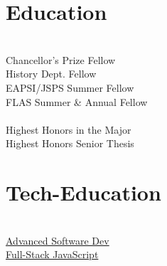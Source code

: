 \documentclass[]{deedy-resume-openfont}
\begin{document}
\begin{minipage}[t]{0.26\textwidth}

\section{Education}
 \\
Chancellor's Prize Fellow \\
History Dept. Fellow \\
EAPSI/JSPS Summer Fellow \\
FLAS Summer \& Annual Fellow \\
\sectionsep
{} \\
\location{}
Highest Honors in the Major \\
Highest Honors Senior Thesis \\
\sectionsep


\section{Tech-Education}
 \\
\location{}
{\href{https://www.codefellows.org/courses/code-401/advanced-software-development-in-full-stack-javascript/}
{ Advanced Software Dev \\
Full-Stack JavaScript}} \\

\end{minipage} 
\end{document}
